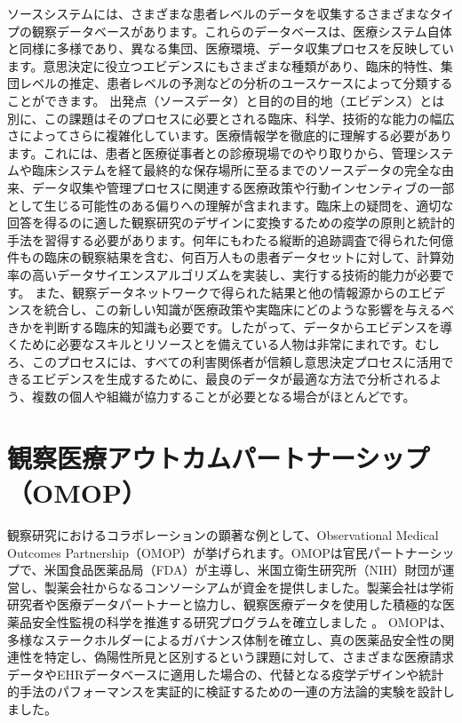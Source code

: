 \documentclass[
  11pt]{book}
\theoremstyle{definition}
\theoremstyle{definition}
\theoremstyle{definition}
\theoremstyle{definition}
\theoremstyle{remark}
\begin{document}
ソースシステムには、さまざまな患者レベルのデータを収集するさまざまなタイプの観察データベースがあります。これらのデータベースは、医療システム自体と同様に多様であり、異なる集団、医療環境、データ収集プロセスを反映しています。意思決定に役立つエビデンスにもさまざまな種類があり、臨床的特性、集団レベルの推定、患者レベルの予測などの分析のユースケースによって分類することができます。 出発点（ソースデータ）と目的の目的地（エビデンス）とは別に、この課題はそのプロセスに必要とされる臨床、科学、技術的な能力の幅広さによってさらに複雑化しています。医療情報学を徹底的に理解する必要があります。これには、患者と医療従事者との診療現場でのやり取りから、管理システムや臨床システムを経て最終的な保存場所に至るまでのソースデータの完全な由来、データ収集や管理プロセスに関連する医療政策や行動インセンティブの一部として生じる可能性のある偏りへの理解が含まれます。臨床上の疑問を、適切な回答を得るのに適した観察研究のデザインに変換するための疫学の原則と統計的手法を習得する必要があります。何年にもわたる縦断的追跡調査で得られた何億件もの臨床の観察結果を含む、何百万人もの患者データセットに対して、計算効率の高いデータサイエンスアルゴリズムを実装し、実行する技術的能力が必要です。 また、観察データネットワークで得られた結果と他の情報源からのエビデンスを統合し、この新しい知識が医療政策や実臨床にどのような影響を与えるべきかを判断する臨床的知識も必要です。したがって、データからエビデンスを導くために必要なスキルとリソースとを備えている人物は非常にまれです。むしろ、このプロセスには、すべての利害関係者が信頼し意思決定プロセスに活用できるエビデンスを生成するために、最良のデータが最適な方法で分析されるよう、複数の個人や組織が協力することが必要となる場合がほとんどです。

\section{観察医療アウトカムパートナーシップ（OMOP）}\label{ux89b3ux5bdfux533bux7642ux30a2ux30a6ux30c8ux30abux30e0ux30d1ux30fcux30c8ux30caux30fcux30b7ux30c3ux30d7omop}

観察研究におけるコラボレーションの顕著な例として、Observational Medical Outcomes Partnership（OMOP）が挙げられます。OMOPは官民パートナーシップで、米国食品医薬品局（FDA）が主導し、米国立衛生研究所（NIH）財団が運営し、製薬会社からなるコンソーシアムが資金を提供しました。製薬会社は学術研究者や医療データパートナーと協力し、観察医療データを使用した積極的な医薬品安全性監視の科学を推進する研究プログラムを確立しました \citep{stang2010omop} 。 OMOPは、多様なステークホルダーによるガバナンス体制を確立し、真の医薬品安全性の関連性を特定し、偽陽性所見と区別するという課題に対して、さまざまな医療請求データやEHRデータベースに適用した場合の、代替となる疫学デザインや統計的手法のパフォーマンスを実証的に検証するための一連の方法論的実験を設計しました。
\end{document}
